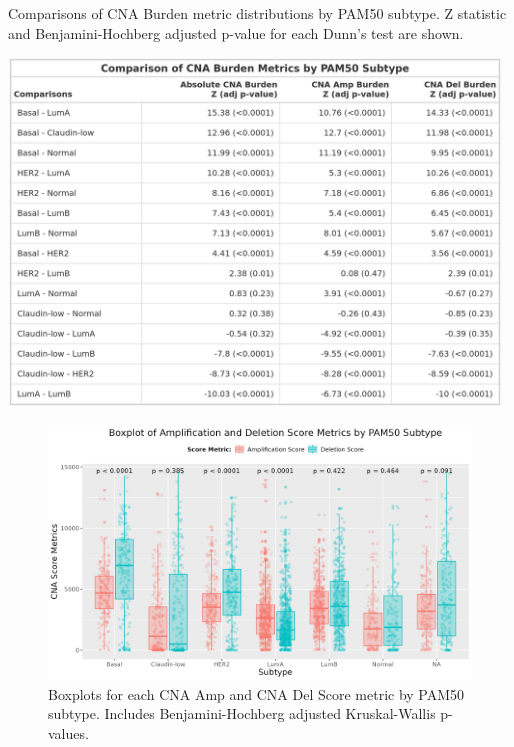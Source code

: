 \begin{table}[!ht]
\center
\caption[Comparisons of CNA Burden metric distributions by PAM50 subtype.]{Comparisons of CNA Burden metric distributions by PAM50 subtype. Z statistic and Benjamini-Hochberg adjusted p-value for each Dunn's test are shown.}
\includegraphics[width=0.98\textwidth]{../tables/Chapter_2/Global_CNA_Burden_Metric_Comparisons.png}
\label{tab:DT_Burden_1}
\end{table}

\begin{figure}[!ht]
\center
\includegraphics[width=1\textwidth]{../figures/Chapter_2/Global_CNA_Score_AmpDel_Across_PAM50.png}
\caption[Boxplots for each CNA Amp and CNA Del Score metric by PAM50 subtype.]{Boxplots for each CNA Amp and CNA Del Score metric by PAM50 subtype. Includes Benjamini-Hochberg adjusted Kruskal-Wallis p-values.}
\label{fig:CNA-Score-Metric-Boxplots-P50-AmpDel}
\end{figure}

